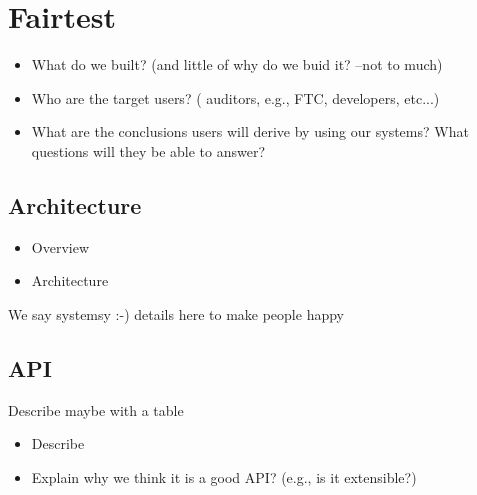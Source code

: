 \section{Fairtest}
\label{sect:fairtest}

\begin{itemize}
  \item What do we built? (and little of why do we buid it? --not to much)
  \item Who are the target users? ( auditors, e.g., FTC, developers, etc...)
  \item What are the conclusions users will derive by using our systems?
    What questions will they be able to answer?
\end{itemize}

\subsection{Architecture}
\begin{itemize}
  \item Overview
  \item Architecture
\end{itemize}
We say systemsy :-) details here to make people happy
 

\subsection{API}
Describe maybe with a table
\begin{itemize}
  \item Describe
  \item Explain why we think it is a good API? (e.g., is it extensible?)
\end{itemize}
